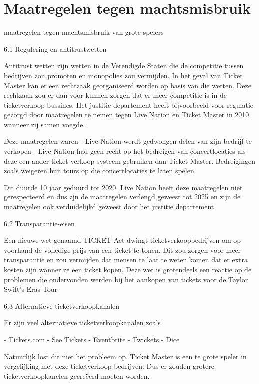 
\section{Maatregelen tegen machtsmisbruik}

maatregelen tegen machtsmisbruik van grote spelers

6.1 Regulering en antitrustwetten

Antitrust wetten zijn wetten in de Verendigde Staten die de competitie tussen bedrijven zou promoten en monopolies
zou vermijden. In het geval van Ticket Master kan er een rechtzaak georganiseerd worden op basis van die wetten.
Deze rechtzaak zou er dan voor kunnen zorgen dat er meer competitie is in de ticketverkoop bussines. 
Het justitie departement heeft bijvoorbeeld voor regulatie gezorgd door maatregelen te nemen tegen 
Live Nation en Ticket Master in 2010 wanneer zij samen voegde.
 
Deze maatregelen waren
- Live Nation werdt gedwongen delen van zijn bedrijf te verkopen
- Live Nation had geen recht op het bedreigen van concertlocaties als deze een ander ticket verkoop systeem gebruiken dan 
  Ticket Master. Bedreigingen zoals weigeren hun tours op die concertlocaties te laten spelen.

Dit duurde 10 jaar geduurd tot 2020. Live Nation heeft deze maatregelen niet gerespecteerd en dus zjn de 
maatregelen verlengd geweest tot 2025 en zijn de maatregelen ook verduidelijkd geweest door het justitie departement.


6.2 Transparantie-eisen

Een nieuwe wet genaamd TICKET Act dwingt ticketverkoopbedrijven om op voorhand de volledige prijs van een ticket
te tonen. Dit zou zorgen voor meer transparantie en zou vermijden dat mensen te laat te weten komen dat er extra 
kosten zijn wanner ze een ticket kopen. Deze wet is grotendeels een reactie op de problemen die ondervonden werden
bij het aankopen van tickets voor de Taylor Swift's Eras Tour


6.3 Alternatieve ticketverkoopkanalen

Er zijn veel alternatieve ticketverkoopkanalen zoals

- Tickets.com
- See Tickets
- Eventbrite
- Twickets
- Dice

Natuurlijk lost dit niet het probleem op. Ticket Master is een te grote speler in vergelijking met deze ticketverkoop
bedrijven. Dus er zouden grotere ticketverkoopkanelen gecreëerd moeten worden.


